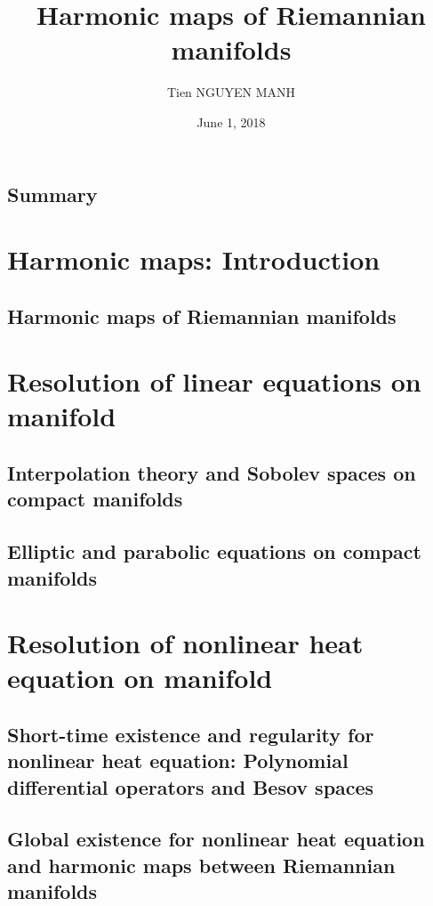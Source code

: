 \documentclass[11pt]{book}
\author{Tien NGUYEN MANH}
\date{June 1, 2018}
\title{Harmonic maps of Riemannian manifolds}
\begin{document}
\maketitle
\tableofcontents
\chapter{Summary}


\part{Harmonic maps: Introduction}
\chapter{Harmonic maps of Riemannian manifolds}


\part{Resolution of linear equations on manifold}

\chapter{Interpolation theory and Sobolev spaces on compact manifolds }


\chapter{Elliptic and parabolic equations on compact manifolds}


\part{Resolution of nonlinear heat equation on manifold}
\chapter[Short-time existence and regularity for nonlinear heat equation]{Short-time existence and regularity for nonlinear heat equation: Polynomial differential operators and Besov spaces}


\chapter[Global existence for nonlinear heat equation]{Global existence for nonlinear heat equation and harmonic maps between Riemannian manifolds}

\end{document}
